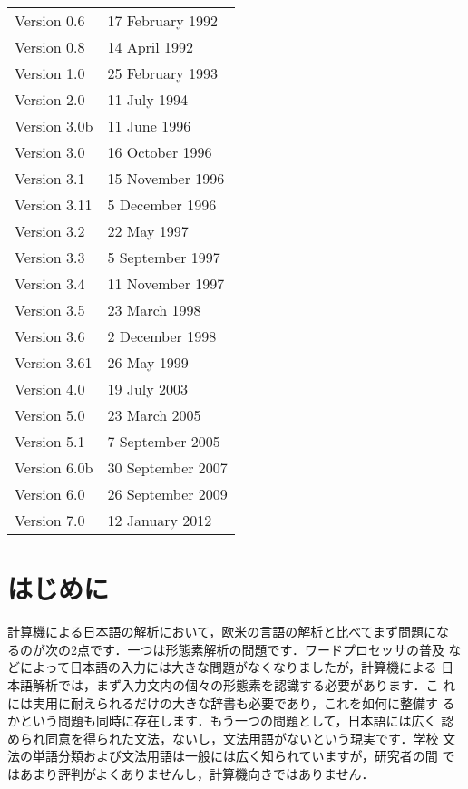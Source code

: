 \documentclass[a4j,titlepage]{jarticle}
\begin{document}
\begin{small}
\begin{tabular}{ll}
Version 0.6 & 17 February 1992 \\
Version 0.8 & 14 April 1992 \\
Version 1.0 & 25 February 1993 \\
Version 2.0 & 11 July 1994 \\
Version 3.0b & 11 June 1996 \\
Version 3.0 & 16 October 1996 \\
Version 3.1 & 15 November 1996 \\
Version 3.11 & 5 December 1996 \\
Version 3.2 & 22 May 1997 \\
Version 3.3 & 5 September 1997 \\
Version 3.4 & 11 November 1997 \\
Version 3.5 & 23 March 1998 \\
Version 3.6 & 2 December 1998 \\
Version 3.61 & 26 May 1999 \\
Version 4.0 & 19 July 2003 \\
Version 5.0 & 23 March 2005 \\
Version 5.1 & 7 September 2005 \\
Version 6.0b & 30 September 2007 \\
Version 6.0 & 26 September 2009 \\
Version 7.0 & 12 January 2012 \\
\end{tabular}
\end{small}

\clearpage

\tableofcontents

\clearpage
{}

\section{はじめに}

計算機による日本語の解析において，欧米の言語の解析と比べてまず問題にな
るのが次の2点です．一つは形態素解析の問題です．ワードプロセッサの普及
などによって日本語の入力には大きな問題がなくなりましたが，計算機による
日本語解析では，まず入力文内の個々の形態素を認識する必要があります．こ
れには実用に耐えられるだけの大きな辞書も必要であり，これを如何に整備す
るかという問題も同時に存在します．もう一つの問題として，日本語には広く
認められ同意を得られた文法，ないし，文法用語がないという現実です．学校
文法の単語分類および文法用語は一般には広く知られていますが，研究者の間
ではあまり評判がよくありませんし，計算機向きではありません．
\end{document}
